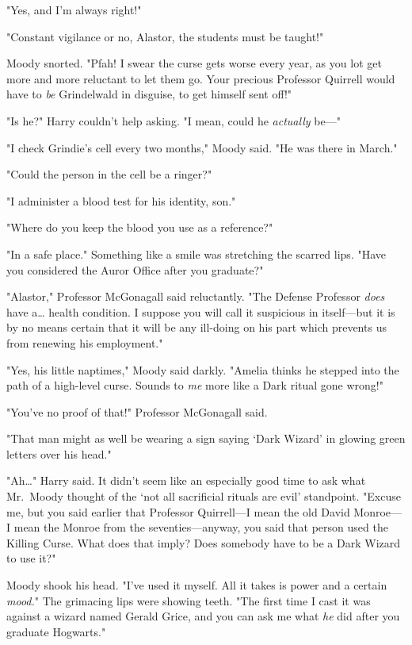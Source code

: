 "Yes, and I'm always right!"

"Constant vigilance or no, Alastor, the students must be taught!"

Moody snorted. "Pfah! I swear the curse gets worse every year, as you lot get
more and more reluctant to let them go. Your precious Professor Quirrell would
have to \emph{be} Grindelwald in disguise, to get himself sent off!"

"Is he?" Harry couldn't help asking. "I mean, could he \emph{actually} be---"

"I check Grindie's cell every two months," Moody said. "He was there in March."

"Could the person in the cell be a ringer?"

"I administer a blood test for his identity, son."

"Where do you keep the blood you use as a reference?"

"In a safe place." Something like a smile was stretching the scarred lips.
"Have you considered the Auror Office after you graduate?"

"Alastor," Professor McGonagall said reluctantly. "The Defense Professor
\emph{does} have a{\ldots} health condition. I suppose you will call it
suspicious in itself---but it is by no means certain that it will be any
ill-doing on his part which prevents us from renewing his employment."

"Yes, his little naptimes," Moody said darkly. "Amelia thinks he stepped into
the path of a high-level curse. Sounds to \emph{me} more like a Dark ritual
gone wrong!"

"You've no proof of that!" Professor McGonagall said.

"That man might as well be wearing a sign saying `Dark Wizard' in glowing green
letters over his head."

"Ah{\ldots}" Harry said. It didn't seem like an especially good time to ask
what Mr.~Moody thought of the `not all sacrificial rituals are evil'
standpoint. "Excuse me, but you said earlier that Professor Quirrell---I mean
the old David Monroe---I mean the Monroe from the seventies---anyway, you said
that person used the Killing Curse. What does that imply? Does somebody have to
be a Dark Wizard to use it?"

Moody shook his head. "I've used it myself. All it takes is power and a certain
\emph{mood.}" The grimacing lips were showing teeth. "The first time I cast it
was against a wizard named Gerald Grice, and you can ask me what \emph{he} did
after you graduate Hogwarts."


